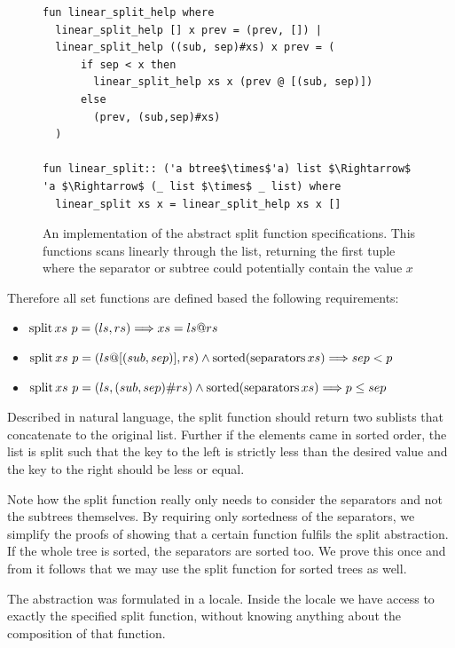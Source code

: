 \begin{figure}
    
\begin{lstlisting}[mathescape=true, language=Isabelle]
fun linear_split_help where
  linear_split_help [] x prev = (prev, []) |
  linear_split_help ((sub, sep)#xs) x prev = (
      if sep < x then
        linear_split_help xs x (prev @ [(sub, sep)])
      else
        (prev, (sub,sep)#xs)
  )

fun linear_split:: ('a btree$\times$'a) list $\Rightarrow$ 'a $\Rightarrow$ (_ list $\times$ _ list) where
  linear_split xs x = linear_split_help xs x []
\end{lstlisting}
\caption[An implementation of the abstract split function specifications.]
{An implementation of the abstract split function specifications.
This functions scans linearly through the list, returning the first tuple where the separator
or subtree could potentially contain the value $x$}
\label{fig:linear_split}

\end{figure}

Therefore all set functions are defined based the following requirements:

\begin{itemize}
    \item $\operatorname{split} xs\ p = (ls,rs) \Longrightarrow xs = ls @ rs$
    \item $\operatorname{split} xs\ p = (ls@[(sub,sep)],rs) \wedge \operatorname{sorted} (\operatorname{separators} xs) \Longrightarrow sep < p$
    \item $\operatorname{split} xs\ p = (ls,(sub,sep)\#rs) \wedge \operatorname{sorted} (\operatorname{separators} xs) \Longrightarrow p \le sep$
\end{itemize}

Described in natural language, the split function should return two sublists
that concatenate to the original list.
Further if the elements came in sorted order,
the list is split such that the key to the left is strictly less than the desired value
and the key to the right should be less or equal.

Note how the split function really only needs to
consider the separators and not the subtrees themselves.
By requiring only sortedness of the separators,
we simplify the proofs of showing that a certain function
fulfils the split abstraction.
If the whole tree is sorted, the separators are sorted too.
We prove this once and from it follows that
we may use the split function for sorted trees as well.

The abstraction was formulated in a locale.
Inside the locale we have access to exactly the specified split function,
without knowing anything about the composition of that function.

